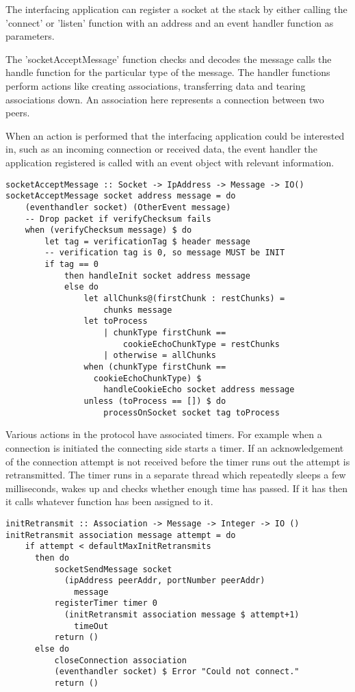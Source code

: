 The interfacing application can register a socket at the stack by either calling the 'connect' or 'listen' function with an address and an event handler function as parameters.

The 'socketAcceptMessage' function checks and decodes the message calls the handle function for the particular type of the message. The handler functions perform actions like creating associations, transferring data and tearing associations down. An association here represents a connection between two peers.

When an action is performed that the interfacing application could be interested in, such as an incoming connection or received data, the event handler the application registered is called with an event object with relevant information.

\begin{lstlisting}[caption={socketAcceptMessage decides what to do with a message}]
socketAcceptMessage :: Socket -> IpAddress -> Message -> IO()
socketAcceptMessage socket address message = do
    (eventhandler socket) (OtherEvent message)
    -- Drop packet if verifyChecksum fails
    when (verifyChecksum message) $ do
        let tag = verificationTag $ header message
        -- verification tag is 0, so message MUST be INIT
        if tag == 0 
            then handleInit socket address message
            else do
                let allChunks@(firstChunk : restChunks) =
                    chunks message
                let toProcess
                    | chunkType firstChunk ==
                        cookieEchoChunkType = restChunks
                    | otherwise = allChunks
                when (chunkType firstChunk == 
                  cookieEchoChunkType) $
                    handleCookieEcho socket address message
                unless (toProcess == []) $ do
                    processOnSocket socket tag toProcess
\end{lstlisting}

Various actions in the protocol have associated timers. For example when a connection is initiated the connecting side starts a timer. If an acknowledgement of the connection attempt is not received before the timer runs out the attempt is retransmitted.
The timer runs in a separate thread which repeatedly sleeps a few milliseconds, wakes up and checks whether enough time has passed. If it has then it calls whatever function has been assigned to it. 

\begin{lstlisting}[caption={The init retransmission function}]
initRetransmit :: Association -> Message -> Integer -> IO ()
initRetransmit association message attempt = do
    if attempt < defaultMaxInitRetransmits
      then do
          socketSendMessage socket 
            (ipAddress peerAddr, portNumber peerAddr)
              message
          registerTimer timer 0
            (initRetransmit association message $ attempt+1)
              timeOut
          return ()
      else do
          closeConnection association
          (eventhandler socket) $ Error "Could not connect."
          return ()
\end{lstlisting}

